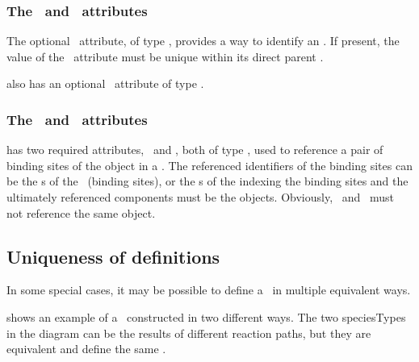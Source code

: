 \subsubsection{The \idAtt\ and \nameAtt\ attributes}
\label{def:InSpeciesTypeBond:idAndName}

The optional \idAtt\ attribute, of type \SIdPT, provides a way to identify an \inSpeciesTypeBond. If present, the value of the \idAtt\ attribute must be unique within its direct parent \speciesType.

 also has an optional \nameAtt\ attribute of type \stringPT. 

\subsubsection{The \bindingSiteOneAtt\ and \bindingSiteTwoAtt\ attributes}
\label{def:InSpeciesTypeBond:bindingSites}

 has two required attributes, \bindingSiteOneAtt\ and \bindingSiteTwoAtt, both of type \SIdRefPT, used to reference a pair of binding sites of the \InSpeciesTypeBond object in a \speciesType. The referenced identifiers of the binding sites can be the \idAtt s of the \speciesTypeInstances\ (binding sites), or the \idAtt s of the  indexing the binding sites  and the ultimately referenced components must be the \BindingSiteSpeciesType objects. Obviously, \bindingSiteOneAtt\ and \bindingSiteTwoAtt\ must not reference the same \BindingSiteSpeciesType object. 


\subsection{Uniqueness of  definitions}
\label{def:SpeciesType:Uniqueness}

In some special cases, it may be possible to define a \speciesType\ in multiple equivalent ways. 

 shows an example of a \speciesType\ constructed in two different ways. The two  speciesTypes in the diagram can be the results of different reaction paths, but they are equivalent and define the same \speciesType.

